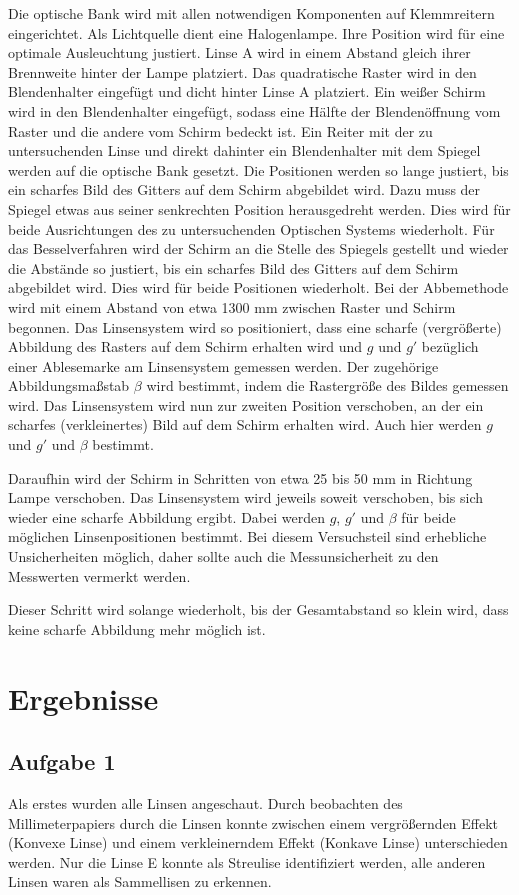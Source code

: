\documentclass[11pt, a4paper]{article}
\begin{document}
    Die optische Bank wird mit allen notwendigen Komponenten auf Klemmreitern eingerichtet. Als Lichtquelle dient eine Halogenlampe. Ihre Position wird für eine optimale Ausleuchtung justiert. Linse A wird in einem Abstand gleich ihrer Brennweite hinter der Lampe platziert. Das quadratische Raster wird in den Blendenhalter eingefügt und dicht hinter Linse A platziert. Ein weißer Schirm wird in den Blendenhalter eingefügt, sodass eine Hälfte der Blendenöffnung vom Raster und die andere vom Schirm bedeckt ist. Ein Reiter mit der zu untersuchenden Linse und direkt dahinter ein Blendenhalter mit dem Spiegel werden auf die optische Bank gesetzt. Die Positionen werden so lange justiert, bis ein scharfes Bild des Gitters auf dem Schirm abgebildet wird. Dazu muss der Spiegel etwas aus seiner senkrechten Position herausgedreht werden. Dies wird für beide Ausrichtungen des zu untersuchenden Optischen Systems wiederholt.
    Für das Besselverfahren wird der Schirm an die Stelle des Spiegels gestellt und wieder die Abstände so justiert, bis ein scharfes Bild des Gitters auf dem Schirm abgebildet wird. Dies wird für beide Positionen wiederholt.
    Bei der Abbemethode wird mit einem Abstand von etwa 1300 mm zwischen Raster und Schirm begonnen. Das Linsensystem wird so positioniert, dass eine scharfe (vergrößerte) Abbildung des Rasters auf dem Schirm erhalten wird und $g$ und $g'$ bezüglich einer Ablesemarke am Linsensystem gemessen werden. Der zugehörige Abbildungsmaßstab $\beta$ wird bestimmt, indem die Rastergröße des Bildes gemessen wird. Das Linsensystem wird nun zur zweiten Position verschoben, an der ein scharfes (verkleinertes) Bild auf dem Schirm erhalten wird. Auch hier werden $g$ und $g'$ und $\beta$ bestimmt.

    Daraufhin wird der Schirm in Schritten von etwa 25 bis 50 mm in Richtung Lampe verschoben. Das Linsensystem wird jeweils soweit verschoben, bis sich wieder eine scharfe Abbildung ergibt. Dabei werden $g$, $g'$ und $\beta$ für beide möglichen Linsenpositionen bestimmt. Bei diesem Versuchsteil sind erhebliche Unsicherheiten möglich, daher sollte auch die Messunsicherheit zu den Messwerten vermerkt werden.

    Dieser Schritt wird solange wiederholt, bis der Gesamtabstand so klein wird, dass keine scharfe Abbildung mehr möglich ist.


    \section{Ergebnisse}
    \subsection{Aufgabe 1}
    Als erstes wurden alle Linsen angeschaut. Durch beobachten des Millimeterpapiers durch die Linsen konnte zwischen einem vergrößernden Effekt (Konvexe Linse) und einem verkleinerndem Effekt (Konkave Linse) unterschieden werden. Nur die Linse E konnte als Streulise identifiziert werden, alle anderen Linsen waren als Sammellisen zu erkennen.
\end{document}
